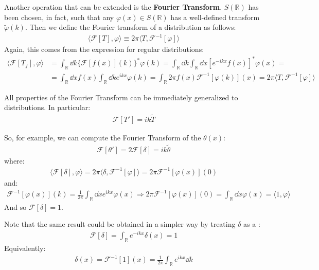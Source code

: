 \documentclass[../template.tex]{subfiles}
\begin{document}
\medskip

Another operation that can be extended is the \textbf{Fourier Transform}.  $S(\mathbb{R})$ has been chosen, in fact, such that any $\varphi(x) \in S(\mathbb{R})$ has a well-defined transform $\tilde{\varphi}(k)$. Then we define the Fourier transform of a distribution as follows:
\begin{align*}
    \langle \mathcal{F}[T], \varphi \rangle \equiv 2\pi\langle T, \mathcal{F}^{-1}[\varphi] \rangle
\end{align*}
Again, this comes from the expression for regular distributions:
\begin{align*}
    \langle \mathcal{F}[T_f], \varphi \rangle &= \int_{\mathbb{R}} \dd{k} \{\mathcal{F}[f(x)](k)\}^* \varphi(k) = \int_{\mathbb{R}} \dd{k} \int_{\mathbb{R}} \dd{x} \left[e^{-ikx} f(x)\right]^* \varphi(x) =\\
    &= \int_{\mathbb{R}} \dd{x} f(x) \int_{\mathbb{R}} \dd{k} e^{ikx}  \varphi(k) = \int_{\mathbb{R}} 2\pi f(x) \mathcal{F}^{-1}[\varphi(k)](x) = 2 \pi\langle T, \mathcal{F}^{-1}[\varphi]  \rangle
\end{align*}

All properties of the Fourier Transform can be immediately generalized to distributions. In particular:
\begin{align*}
    \mathcal{F}[T'] = ik \tilde{T}
\end{align*}

So, for example, we can compute the Fourier Transform of the $\theta(x)$: 
\begin{align} \label{eqn:theta-transf1}
    \mathcal{F}[\theta'] = 2 \mathcal{F}[\delta] = ik \tilde{\theta}
\end{align}
where: 
\begin{align*}
    \langle \mathcal{F}[\delta], \varphi \rangle = 2 \pi\langle \delta, \mathcal{F}^{-1}[\varphi]\rangle = 2\pi\mathcal{F}^{-1}[\varphi(x)](0)
\end{align*}
and:
\begin{align*}
    \mathcal{F}^{-1}[\varphi(x)](k) = \frac{1}{2\pi} \int_{\mathbb{R}} \dd{x} e^{ikx} \varphi(x) \Rightarrow 2 \pi\mathcal{F}^{-1}[\varphi(x)](0) = \int_{\mathbb{R}} \dd{x} \varphi(x) = \langle 1, \varphi \rangle 
\end{align*}
And so $\mathcal{F}[\delta] = 1$. 

Note that the same result could be obtained in a simpler way by treating $\delta$ as a :
\begin{align*}
    \mathcal{F}[\delta] = \int_{\mathbb{R}} e^{-ikx} \delta(x) = 1
\end{align*}
Equivalently:
\begin{align*}
    \delta(x) = \mathcal{F}^{-1}[1](x) = \frac{1}{2\pi} \int_{\mathbb{R}} e^{ikx} \dd{k}
\end{align*}
\end{document}
